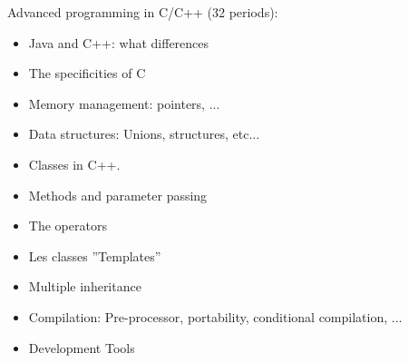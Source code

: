 Advanced programming in C/C++ (32 periods):
\begin{itemize}
    \item Java and C++: what differences
    \item The specificities of C
    \item Memory management: pointers, ...
    \item Data structures: Unions, structures, etc...
    \item Classes in C++.
    \item Methods and parameter passing
    \item The operators
    \item Les classes ''Templates''
    \item Multiple inheritance
    \item Compilation: Pre-processor, portability, conditional compilation, ...
    \item Development Tools
\end{itemize}